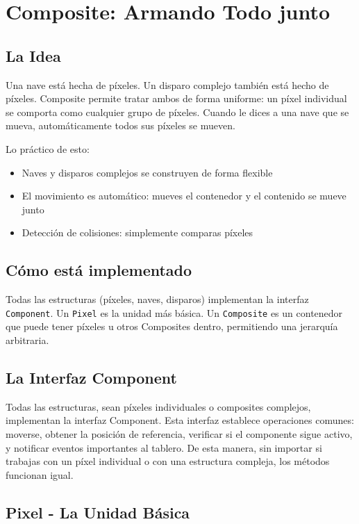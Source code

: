 \documentclass[12pt]{article}
\begin{document}
\newpage
\section{Composite: Armando Todo junto}

\subsection{La Idea}

Una nave está hecha de píxeles. Un disparo complejo también está hecho de píxeles. Composite permite tratar ambos de forma uniforme: un píxel individual se comporta como cualquier grupo de píxeles. Cuando le dices a una nave que se mueva, automáticamente todos sus píxeles se mueven.

Lo práctico de esto:
\begin{itemize}
    \item Naves y disparos complejos se construyen de forma flexible
    \item El movimiento es automático: mueves el contenedor y el contenido se mueve junto
    \item Detección de colisiones: simplemente comparas píxeles
\end{itemize}

\subsection{Cómo está implementado}

Todas las estructuras (píxeles, naves, disparos) implementan la interfaz \texttt{Component}. Un \texttt{Pixel} es la unidad más básica. Un \texttt{Composite} es un contenedor que puede tener píxeles u otros Composites dentro, permitiendo una jerarquía arbitraria.

\subsection{La Interfaz Component}

Todas las estructuras, sean píxeles individuales o composites complejos, implementan la interfaz Component. Esta interfaz establece operaciones comunes: moverse, obtener la posición de referencia, verificar si el componente sigue activo, y notificar eventos importantes al tablero. De esta manera, sin importar si trabajas con un píxel individual o con una estructura compleja, los métodos funcionan igual.

\subsection{Pixel - La Unidad Básica}
\end{document}
